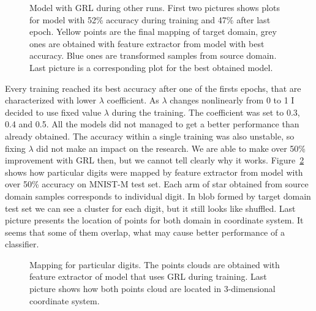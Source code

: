 \documentclass{article}
\begin{document}
\begin{figure}%
\captionsetup[subfigure]{labelformat=empty}
    \centering
    \qquad
    \qquad
    \caption{Model with GRL during other runs. First two pictures shows plots for model with 52\% accuracy during training and 47\% after last epoch. Yellow points are the final mapping of target domain, grey ones are obtained with feature extractor from model with best accuracy. Blue ones are transformed samples from source domain. Last picture is a corresponding plot for the best obtained model.}%
    \label{fig:GRL3D_2}%
\end{figure}
\par
Every training reached its best accuracy after one of the firsts epochs, that are characterized with lower $\lambda$ coefficient. As $\lambda$ changes nonlinearly from 0 to 1 I decided to use fixed value $\lambda$ during the training. The coefficient was set to 0.3, 0.4 and 0.5. All the models did not managed to get a better performance than already obtained. The accuracy within a single training was also unstable, so fixing $\lambda$ did not make an impact on the research. We are able to make over 50\% improvement with GRL then, but we cannot tell clearly why it works. Figure~\ref{fig:GRL_digits} shows how particular digits were mapped by feature extractor from model with over 50\% accuracy on MNIST-M test set. Each arm of star obtained from source domain samples corresponds to individual digit. In blob formed by target domain test set we can see a cluster for each digit, but it still looks like shuffled. Last picture presents the location of points for both domain in coordinate system. It seems that some of them overlap, what may cause better performance of a classifier.

\begin{figure}%
    \centering
    \qquad
    \qquad
    \caption{Mapping for particular digits. The points clouds are obtained with feature extractor of model that uses GRL during training. Last picture shows how both points cloud are located in 3-dimensional coordinate system.}%
    \label{fig:GRL_digits}%
\end{figure}
\end{document}
